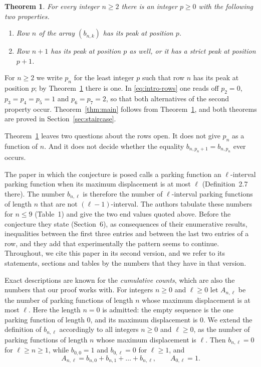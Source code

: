 \documentclass{amsart}
\makeatletter
\newtheorem{theorem}{Theorem}[section]
\theoremstyle{definition}
\theoremstyle{remark}
\numberwithin{equation}{section}
\def\subsection{\@startsection{subsection}{2}\z@{.5\linespacing\@plus.7\linespacing}{-.5em}{\normalfont\bfseries\boldmath}}
\makeatother
\begin{document}
\begin{theorem}\label{thm:peaks}
For every integer $n\ge2$ there is an integer $p\ge0$ with the following two
properties.
\begin{enumerate}
\item Row $n$ of the array $(b_{n,k})$ has its peak at position $p$.
\item Row $n+1$ has its peak at position $p$ as well, or it has a
strict peak at position $p+1$.
\end{enumerate}
\end{theorem}

For $n\ge2$ we write $p_n$ for the least integer $p$ such that row $n$
has its peak at position $p$; by Theorem~\ref{thm:peaks} there is one. In
\eqref{eq:intro-rows} one reads off $p_2=0$, $p_3=p_4=p_5=1$ and
$p_6=p_7=2$, so that both alternatives of the second property occur.
Theorem~\ref{thm:main} follows from Theorem~\ref{thm:peaks}, and both
theorems are proved in Section~\ref{sec:staircase}.

Theorem~\ref{thm:peaks} leaves two questions about the rows open. It does
not give $p_n$ as a function of $n$. And it does not decide whether the
equality
$b_{n,p_n+1}=b_{n,p_n}$ ever occurs.

\subsection{Earlier work}\label{subsec:intro-earlier}

The paper \cite{celano2025} in which the conjecture is posed calls a parking
function an $\ell$-interval parking function when its maximum displacement
is at most $\ell$ (Definition~2.7 there). The number $b_{n,\ell}$ is
therefore the number of $\ell$-interval parking functions of length $n$ that
are not $(\ell-1)$-interval. The authors tabulate these numbers for $n\le9$
(Table~1) and give the two end values quoted above. Before the conjecture
they state (Section~6), as consequences of their enumerative results,
inequalities between the first three entries and between the last two
entries of a row, and they add that experimentally the pattern seems to
continue. Throughout, we cite this paper
in its second version, and we refer to its statements, sections and tables
by the numbers that they have in that version.

Exact descriptions are known for the \emph{cumulative counts}, which are also
the numbers that our proof works with. For integers $n\ge0$ and $\ell\ge0$
let $A_{n,\ell}$ be the number of parking functions of length $n$ whose
maximum displacement is at most $\ell$. Here the length $n=0$ is
admitted: the empty sequence is the one parking function of length $0$, and
its maximum displacement is $0$. We extend the definition of $b_{n,\ell}$
accordingly to all integers $n\ge0$ and $\ell\ge0$, as the number of parking
functions of length $n$ whose maximum displacement is $\ell$. Then
$b_{n,\ell}=0$ for $\ell\ge n\ge1$, while $b_{0,0}=1$ and $b_{0,\ell}=0$ for
$\ell\ge1$, and
\[
A_{n,\ell}=b_{n,0}+b_{n,1}+\dots+b_{n,\ell},\qquad A_{0,\ell}=1.
\]
\end{document}
